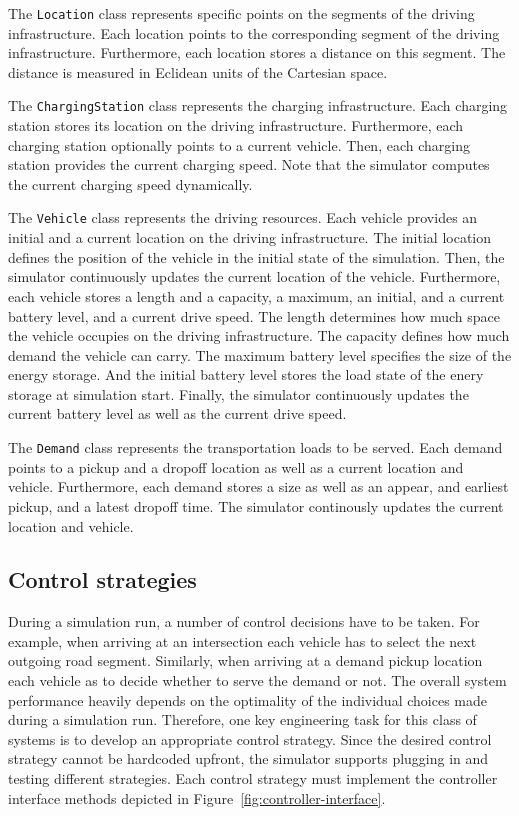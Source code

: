 \documentclass[a4paper,twoside]{article}
\begin{document}
	The \texttt{Location} class represents specific points on the segments of the driving infrastructure.
	Each location points to the corresponding segment of the driving infrastructure.
	Furthermore, each location stores a distance on this segment.
	The distance is measured in Eclidean units of the Cartesian space.
	
	The \texttt{ChargingStation} class represents the charging infrastructure.
	Each charging station stores its location on the driving infrastructure.
	Furthermore, each charging station optionally points to a current vehicle.
	Then, each charging station provides the current charging speed.
	Note that the simulator computes the current charging speed dynamically.
	
	The \texttt{Vehicle} class represents the driving resources.
	Each vehicle provides an initial and a current location on the driving infrastructure.
	The initial location defines the position of the vehicle in the initial state of the simulation.
	Then, the simulator continuously updates the current location of the vehicle.
	Furthermore, each vehicle stores a length and a capacity, a maximum, an initial, and a current battery level, and a current drive speed.
	The length determines how much space the vehicle occupies on the driving infrastructure.
	The capacity defines how much demand the vehicle can carry.
	The maximum battery level specifies the size of the energy storage.
	And the initial battery level stores the load state of the enery storage at simulation start.
	Finally, the simulator continuously updates the current battery level as well as the current drive speed.
	
	The \texttt{Demand} class represents the transportation loads to be served.
	Each demand points to a pickup and a dropoff location as well as a current location and vehicle.
	Furthermore, each demand stores a size as well as an appear, and earliest pickup, and a latest dropoff time.
	The simulator continously updates the current location and vehicle.
	
	\subsection{Control strategies}
	\label{sec:controller-interface}
	
	
	During a simulation run, a number of control decisions have to be taken.
	For example, when arriving at an intersection each vehicle has to select the next outgoing road segment.
	Similarly, when arriving at a demand pickup location each vehicle as to decide whether to serve the demand or not.
	The overall system performance heavily depends on the optimality of the individual choices made during a simulation run.
	Therefore, one key engineering task for this class of systems is to develop an appropriate control strategy.
	Since the desired control strategy cannot be hardcoded upfront, the simulator supports plugging in and testing different strategies.
	Each control strategy must implement the controller interface methods depicted in Figure~\ref{fig:controller-interface}.
	
\end{document}
